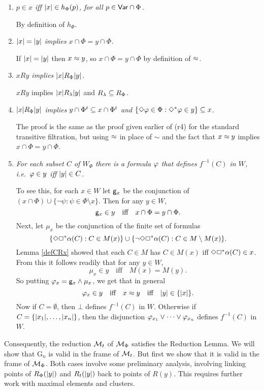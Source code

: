 \begin{enumerate}[(r1):]
\item 
\emph{$p\in x$ iff $|x|\in h_\Phi(p)$, for all $p\in\mathsf{Var}\cap\Phi$.}

 By definition of $h_\Phi$.

\item
\emph{$|x|=|y|$ implies $x\cap\Phi= y\cap\Phi$.} 

If $|x|=|y|$ then $x\approx y$, so $x\cap\Phi= y\cap\Phi$ by definition of $\approx$.

\item
\emph{$xRy$ implies $|x|R_\Phi |y|$.}

$xRy$ implies $|x|R_\lambda |y|$ and $R_\lambda\subseteq R_\Phi$.
\item
\emph{$|x|R_\Phi |y|$ implies  $y\cap \Phi^t\subseteq x\cap\Phi^t$ and 
$\{\Diamond\varphi\in\Phi:\Diamond^*\varphi\in y\}\subseteq x$.}

The proof is the same as the proof given earlier of (r4) for the standard transitive filtration, but using $\approx$ in place of $\sim$ and the fact that $x\approx y$ implies $x\cap\Phi= y\cap\Phi$.

\item 
\emph{For each subset $C$ of $W_\Phi$ there is a formula $\varphi$ that defines $f^{-1}(C)$ in $W$, i.e.\ $\varphi\in y$ iff
 $|y|\in C$.}
 
 To see this, for each $x\in W$ let ${\sf g}_x$ be the conjunction of $(x\cap\Phi)\cup\{\neg\psi:\psi\in\Phi\setminus x\}$. Then for any $y\in W$,
 $$
 {\sf g}_x\in y \quad\text{iff}\quad x\cap\Phi =  y\cap\Phi.
 $$
 Next, let $\mu_x$ be the conjunction of the finite set of formulas
 $$
 \{\Diamond\Box^*\alpha(C): C\in M(x)\}\cup \{\neg\Diamond\Box^*\alpha(C): C\in M\setminus M(x)\}.
 $$
 Lemma \ref{defCRx} showed that each $C\in M$ has $C\in M(x)$ iff $\Diamond\Box^*\alpha(C)\in x$. From this it follows readily that
for any $y\in W$,
 $$
 \mu_x\in y \quad\text{iff}\quad M(x)=M(y).
 $$
 So putting $\varphi_x={\sf g}_x\land\mu_x$, we get that in general
 $$
 \varphi_x\in y \quad\text{iff}\quad x\approx y \quad\text{iff}\quad |y|\in\{|x|\}.
 $$
 Now if $C=\emptyset$, then $\bot$ defines $f^{-1}(C)$ in $W$. Otherwise if $C=\{|x_1|,\dots,|x_n|\}$, then the disjunction
 $
 \varphi_{x_1}\lor\cdots\lor\varphi_{x_n}
 $
 defines $f^{-1}(C)$ in $W$.%
 \end{enumerate}
%
Consequently, the reduction $\mathcal{M}_t$ of $\mathcal{M}_\Phi$ satisfies the Reduction Lemma. We will show that G$_n$ is valid in the frame of $\mathcal{M}_t$.  But first we show that it is valid in the frame of $\mathcal{M}_\Phi$. Both cases involve some preliminary analysis,  involving linking points of $R_\Phi(|y|)$  and $R_t(|y|)$ back to points of $R(y)$. This requires further work with maximal elements and clusters.

